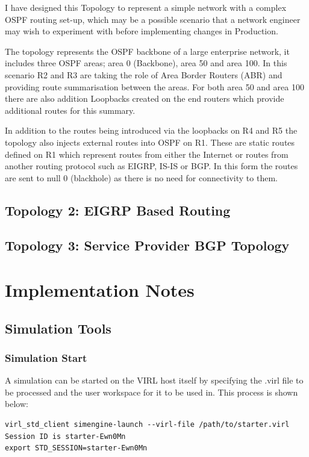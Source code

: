\documentclass[11pt]{report}
\begin{document}
I have designed this Topology to represent a simple network with a complex OSPF routing set-up, which may be a possible scenario that a network engineer may wish to experiment with before implementing changes in Production.

The topology represents the OSPF backbone of a large enterprise network, it includes three OSPF areas; area 0 (Backbone), area 50 and area 100. In this scenario R2 and R3 are taking the role of Area Border Routers (ABR) and providing route summarisation between the areas. For both area 50 and area 100 there are also addition Loopbacks created on the end routers which provide additional routes for this summary.

In addition to the routes being introduced via the loopbacks on R4 and R5 the topology also injects external routes into OSPF on R1. These are static routes defined on R1 which represent routes from either the Internet or routes from another routing protocol such as EIGRP, IS-IS or BGP. In this form the routes are sent to null 0 (blackhole) as there is no need for connectivity to them.

\section{Topology 2: EIGRP Based Routing}

\section{Topology 3: Service Provider BGP Topology}

\chapter*{Implementation Notes}

\section*{Simulation Tools}

\subsection*{Simulation Start}

A simulation can be started on the VIRL host itself by specifying the .virl file to be processed and the user workspace for it to be used in. This process is shown below:

\begin{lstlisting}
virl_std_client simengine-launch --virl-file /path/to/starter.virl
Session ID is starter-Ewn0Mn
export STD_SESSION=starter-Ewn0Mn
\end{lstlisting}
\end{document}
